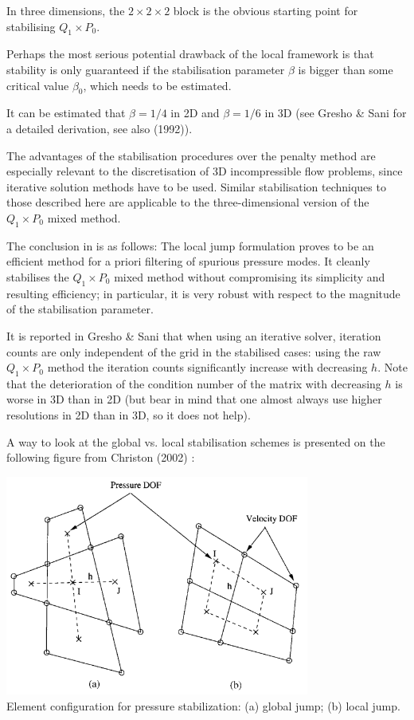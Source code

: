 In three dimensions, the $2\times 2 \times 2$ block is the obvious starting point 
for stabilising $Q_1\times P_0$.

Perhaps the most serious potential drawback of the local framework is that 
stability is only guaranteed if the stabilisation parameter $\beta$ is bigger than some 
critical value $\beta_0$, which needs to be estimated.

It can be estimated that $\beta=1/4$ in 2D and $\beta=1/6$ in 3D (see Gresho \& Sani \cite[p636]{grsa} 
for a detailed derivation, see also \textcite{vibo92} (1992)). 

The advantages of the stabilisation procedures over the penalty method 
are especially relevant to the discretisation of 3D incompressible flow problems, 
since iterative solution methods have to be used. 
Similar stabilisation techniques to those described here are applicable to  
the three-dimensional version of the $Q_1 \times P_0$ mixed method.

The conclusion in \cite{sike90} is as follows:
The local jump formulation proves to be an efficient method for a priori filtering of  
spurious pressure modes. It cleanly stabilises the $Q_1\times P_0$ mixed method without compromising 
its simplicity and resulting efficiency; in particular, it is very robust with respect to the magnitude
of the stabilisation parameter. 

It is reported in Gresho \& Sani \cite{grsa} that when using an iterative solver, iteration counts 
are only independent of the grid in the stabilised cases: using the raw $Q_1\times P_0$ method
the iteration counts significantly increase with decreasing $h$. Note that the deterioration
of the condition number of the matrix with decreasing $h$ is worse in 3D than in 2D (but
bear in mind that one almost always use higher resolutions in 2D than in 3D, so it does not help).

A way to look at the global vs. local stabilisation schemes is presented 
on the following figure from Christon (2002) \cite{chri02}:

\begin{center}
\includegraphics[width=10cm]{images/q1p0stab/chri02}\\
{\captionfont Element configuration for pressure stabilization: (a) global jump; (b) local jump.}
\end{center}


